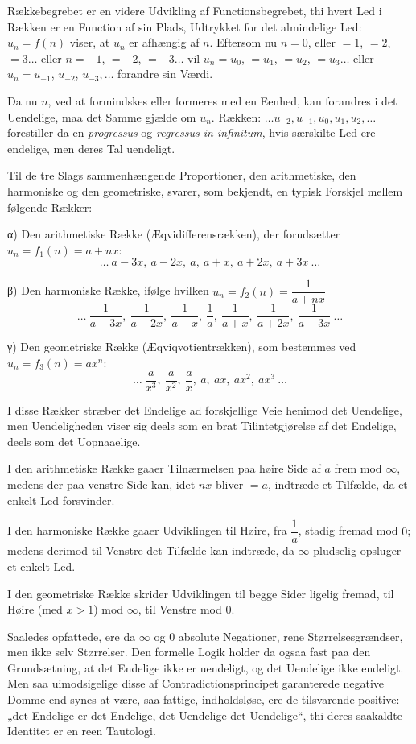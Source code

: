 \documentclass[12pt]{book}
\newcommand{\opage}[1]{\marginnote{\footnotesize\textit{[#1]}}}
\begin{document}
Rækkebegrebet er en videre Udvikling af Functionsbegrebet, thi hvert Led i Rækken
er en Function af sin Plads, Udtrykket for det almindelige Led: $u_n = f(n)$
viser, at $u_n$ er afhængig af $n$. Eftersom nu $n = 0$, eller $= 1$, $= 2$,
$= 3\dots$ eller $n = -1$, $= -2$, $= -3\dots$ vil $u_n = u_0$, $= u_1$, $= u_2$,
$= u_3\dots$ eller $u_n = u_{-1}$, $u_{-2}$, $u_{-3},\dots$ forandre sin Værdi.

Da nu $n$, ved at formindskes eller formeres med en Eenhed, kan forandres i det
Uendelige, maa det Samme gjælde om $u_n$. Rækken: $\dots u_{-2}, u_{-1}, u_0, u_1,
u_2, \dots$ forestiller da en \textit{progressus} og \textit{regressus in
infinitum}, hvis særskilte Led ere endelige, men deres Tal uendeligt.

Til de tre Slags sammenhængende Proportioner, den arithmetiske, den harmoniske og
den geometriske, svarer, som bekjendt, en typisk Forskjel mellem følgende Rækker:

α) Den arithmetiske Række (Æqvidifferensrækken), der forudsætter
$u_n = f_1(n) = a + nx$:
\[
\dots\ a-3x,\ a-2x,\ a,\ a+x,\ a+2x,\ a+3x\ \dots
\]

β) Den harmoniske Række, ifølge hvilken $u_n = f_2(n) = \dfrac{1}{a+nx}$
\opage{21} \[
\dots\ \frac{1}{a-3x},\ \frac{1}{a-2x},\ \frac{1}{a-x},\ \frac{1}{a},\
\frac{1}{a+x},\ \frac{1}{a+2x},\ \frac{1}{a+3x}\ \dots
\]

γ) Den geometriske Række (Æqviqvotientrækken), som bestemmes ved
$u_n = f_3(n) = ax^{n}$:
\[
\dots\ \frac{a}{x^{3}},\ \frac{a}{x^{2}},\ \frac{a}{x},\ a,\ ax,\ ax^{2},\
ax^{3}\ \dots
\]

I disse Rækker stræber det Endelige ad forskjellige Veie henimod det Uendelige,
men Uendeligheden viser sig deels som en brat Tilintetgjørelse af det Endelige,
deels som det Uopnaaelige.

I den arithmetiske Række gaaer Tilnærmelsen paa høire Side af $a$ frem mod
$\infty$, medens der paa venstre Side kan, idet $nx$ bliver $= a$, indtræde et
Tilfælde, da et enkelt Led forsvinder.

I den harmoniske Række gaaer Udviklingen til Høire, fra $\dfrac{1}{a}$, stadig
fremad mod $0$; medens derimod til Venstre det Tilfælde kan indtræde, da $\infty$
pludselig opsluger et enkelt Led.

I den geometriske Række skrider Udviklingen til begge Sider ligelig fremad, til
Høire (med $x > 1$) mod $\infty$, til Venstre mod $0$.

Saaledes opfattede, ere da $\infty$ og $0$ absolute Negationer, rene
Størrelsesgrændser, men ikke selv Størrelser. Den formelle Logik holder da ogsaa
fast paa den Grundsætning, at det Endelige ikke er uendeligt, og det Uendelige
ikke endeligt. Men saa uimodsigelige disse af Contradictionsprincipet
garanterede negative Domme end synes at være, saa fattige, indholdsløse, ere de
tilsvarende positive: „det Endelige er det Endelige, det Uendelige det
Uendelige“, thi deres saakaldte Identitet er en reen Tautologi.
\end{document}

